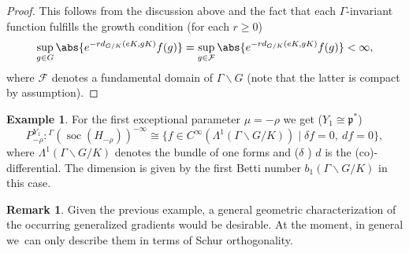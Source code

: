 \documentclass[JEP,XML,SOM,NoFloatCountersInSection,Unicode,published]{cedram}
\newcommand{\Ga}{{}^\Gamma\!}
\theoremstyle{definition}
\newtheorem{example}[theorem]{Example}
\newtheorem{remark}[theorem]{Remark}
\DeclarePairedDelimiter{\abs}\lvert\rvert
\newcommand{\mc}[1]{\ensuremath{\mathcal{#1}}}
\newcommand{\mf}[1]{\ensuremath{\mathfrak{#1}}}
\newcommand{\on}[1]{\ensuremath{\operatorname{#1}}}
\newcommand{\rhoa}{\ensuremath{\rho}}
\newcommand{\pst}[1]{\ensuremath{H_{#1}}}
\begin{document}
\begin{proof}
This follows from the discussion above and the fact that each $\Gamma$-invariant function fulfills the growth condition (for each $r\geq 0$)
\[
\sup_{g\in G}\abs{e^{-rd_{G/K}(eK,gK)}f(g)}=\sup_{g\in\mc{F}}\abs{e^{-rd_{G/K}(eK,gK)}f(g)}<\infty,
\]
where $\mc{F}$ denotes a fundamental domain of $\Gamma\backslash G$ (note that the latter is compact by assumption).
\end{proof}

\begin{example}
For the first exceptional parameter $\mu=-\rhoa$ we get ($Y_1\cong\mf p^*$)
\[
P_{-\rhoa}^{Y_{1}}\colon\Ga(\on{soc}(\pst{-\rhoa}))^{-\infty}\cong\{f\in C^\infty(\Lambda^1(\Gamma\backslash G/K))\mid\delta f=0,\ d{ }f=0\},
\]
where $\Lambda^1(\Gamma\backslash G/K)$ denotes the bundle of one forms and ($\delta$ \resp ) $d$ is the (co)-differential. The dimension is given by the first Betti number $b_1(\Gamma\backslash G/K)$ in this case.
\end{example}

\begin{remark}
Given the previous example, a general geometric characterization of the occurring generalized gradients would be desirable. At the moment, in general we~can only describe them in terms of Schur orthogonality.
\end{remark}
\end{document}
